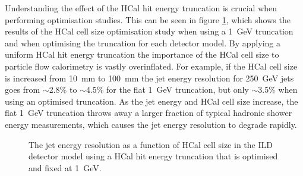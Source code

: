 Understanding the effect of the HCal hit energy truncation is crucial when performing optimisation studies.  This can be seen in figure \ref{fig:jerhcalcellopt}, which shows the results of the HCal cell size optimisation study when using a 1~GeV truncation and when optimising the truncation for each detector model.  By applying a uniform HCal hit energy truncation the importance of the HCal cell size to particle flow calorimetry is vastly overinflated.  For example, if the HCal cell size is increased from 10~mm to 100~mm the jet energy resolution for 250~GeV jets goes from $\sim$2.8\% to $\sim$4.5\% for the flat 1~GeV truncation, but only $\sim$3.5\% when using an optimised truncation.  As the jet energy and HCal cell size increase, the flat 1~GeV truncation throws away a larger fraction of typical hadronic shower energy measurements, which causes the jet energy resolution to degrade rapidly.  

\begin{figure}[h!]
\caption[The jet energy resolution as a function of HCal cell size in the ILD detector model using a HCal hit energy truncation that is \protect{} optimised and \protect{} fixed at 1~GeV.]{The jet energy resolution as a function of HCal cell size in the ILD detector model using a HCal hit energy truncation that is \protect{} optimised and \protect{} fixed at 1~GeV.}
\label{fig:jerhcalcellopt}
\end{figure}

